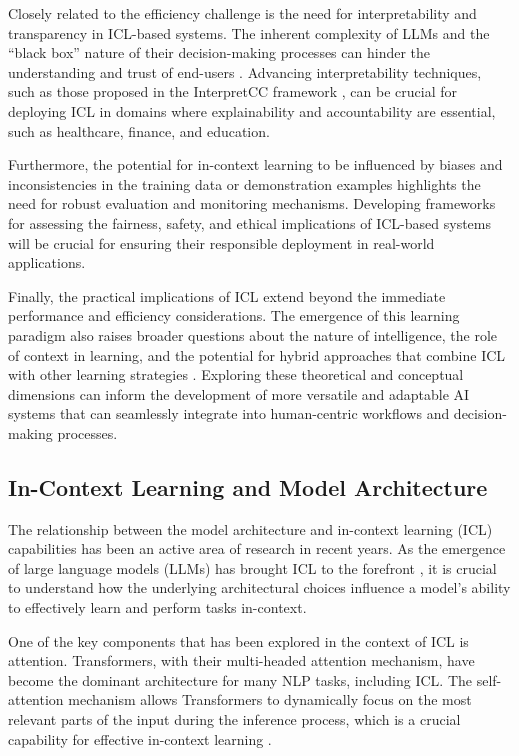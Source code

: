 \documentclass[11pt]{article}
\begin{document}
Closely related to the efficiency challenge is the need for interpretability and transparency in ICL-based systems. The inherent complexity of LLMs and the ``black box'' nature of their decision-making processes can hinder the understanding and trust of end-users \cite{ref97}. Advancing interpretability techniques, such as those proposed in the InterpretCC framework \cite{ref98}, can be crucial for deploying ICL in domains where explainability and accountability are essential, such as healthcare, finance, and education.

Furthermore, the potential for in-context learning to be influenced by biases and inconsistencies in the training data or demonstration examples \cite{ref90} highlights the need for robust evaluation and monitoring mechanisms. Developing frameworks for assessing the fairness, safety, and ethical implications of ICL-based systems will be crucial for ensuring their responsible deployment in real-world applications.

Finally, the practical implications of ICL extend beyond the immediate performance and efficiency considerations. The emergence of this learning paradigm also raises broader questions about the nature of intelligence, the role of context in learning, and the potential for hybrid approaches that combine ICL with other learning strategies \cite{ref2,ref13,ref47,ref99,ref5}. Exploring these theoretical and conceptual dimensions can inform the development of more versatile and adaptable AI systems that can seamlessly integrate into human-centric workflows and decision-making processes.

\subsection{In-Context Learning and Model Architecture}

The relationship between the model architecture and in-context learning (ICL) capabilities has been an active area of research in recent years. As the emergence of large language models (LLMs) has brought ICL to the forefront \cite{ref35}, it is crucial to understand how the underlying architectural choices influence a model's ability to effectively learn and perform tasks in-context.

One of the key components that has been explored in the context of ICL is attention. Transformers, with their multi-headed attention mechanism, have become the dominant architecture for many NLP tasks, including ICL. The self-attention mechanism allows Transformers to dynamically focus on the most relevant parts of the input during the inference process, which is a crucial capability for effective in-context learning \cite{ref35}.
\end{document}
